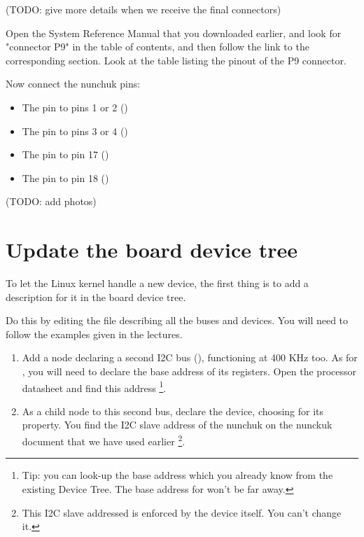 (TODO: give more details when we receive the final connectors)

Open the System Reference Manual that you downloaded earlier,
and look for "connector P9" in the table of contents, and then
follow the link to the corresponding section. Look at the table listing
the pinout of the P9 connector.

Now connect the nunchuk pins:
\begin{itemize}
\item The  pin to pins 1 or 2 ()
\item The  pin to pins 3 or 4 ()
\item The  pin to pin 17 ()
\item The  pin to pin 18 ()
\end{itemize}

(TODO: add photos)

\section{Update the board device tree}

To let the Linux kernel handle a new device, the first thing is to add a
description for it in the board device tree.

Do this by editing the 
file describing all the buses and devices. You will need to follow the
examples given in the lectures.

\begin{enumerate}
\item Add a node declaring a second I2C bus (), functioning
      at 400 KHz too. As for , you will need to declare
      the base address of its registers. Open the processor datasheet
      and find this address
      \footnote{Tip: you can look-up the  base address which
      you already know from the existing Device Tree. The base address
      for  won't be far away.}.
\item As a child node to this second bus, declare the 
      device, choosing  for its 
      property. You find the I2C slave address of the nunchuk on
      the nunckuk document that we have used earlier
      \footnote{This I2C slave addressed is enforced by the device
      itself. You can't change it.}.
\end{enumerate}


